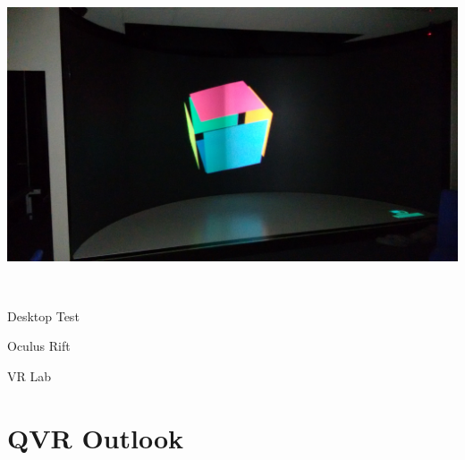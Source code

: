\documentclass[utf8,stillsansserifmath,fleqn,t]{beamer}
\begin{document}
\begin{frame}[fragile]
\begin{minipage}{.3\textwidth}
\end{minipage}\hfill
\begin{minipage}{.3\textwidth}
\includegraphics[width=\textwidth]{./fig/minimal-result-2.jpg}\\
\end{minipage}\\
\begin{minipage}{.3\textwidth}
\centerline{Desktop Test}
\end{minipage}\hfill
\begin{minipage}{.3\textwidth}
\centerline{Oculus Rift}
\end{minipage}\hfill
\begin{minipage}{.3\textwidth}
\centerline{VR Lab}
\end{minipage}
\end{frame}

\section{QVR Outlook}
\end{document}
